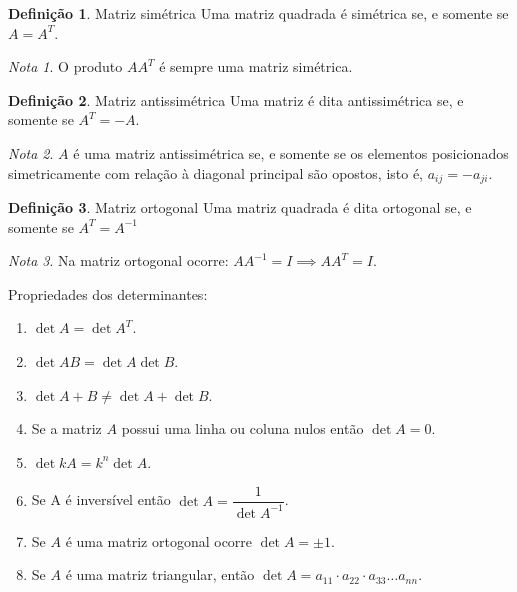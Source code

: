 \documentclass{article}
\theoremstyle{definition}
\newtheorem{definition}{Definição}
\theoremstyle{remark}
\newtheorem*{remark}{Nota}
\begin{document}
    \begin{definition}{Matriz simétrica}
        Uma matriz quadrada é simétrica se, e somente se $A = A^T$.
    \end{definition}
    \theoremstyle{remark}
    \begin{remark}
        O produto $AA^T$ é sempre uma matriz simétrica.
    \end{remark}
    \begin{definition}{Matriz antissimétrica}
        Uma matriz é dita antissimétrica se, e somente se $A^T = -A$.
    \end{definition}
    \begin{remark}
        $A$ é uma matriz antissimétrica se, e somente se os elementos posicionados simetricamente com relação à diagonal principal
        são opostos, isto é, $a_{ij} = -a_{ji}$.
    \end{remark}
    \begin{definition}{Matriz ortogonal}
        Uma matriz quadrada é dita ortogonal se, e somente se $A^T = A^{-1}$
    \end{definition}
    \begin{remark}
        Na matriz ortogonal ocorre: $AA^{-1} = I \implies AA^T = I$.
    \end{remark}
    Propriedades dos determinantes:
    \begin{enumerate}
        \item $\det A = \det{A^T}$.
        \item $\det{AB} = \det A \det B$.
        \item $\det{A+B} \neq \det A + \det B$.
        \item Se a matriz $A$ possui uma linha ou coluna nulos então $\det A = 0$.
        \item $\det{kA} = k^n \det A$.
        \item Se A é inversível então $\det A = \dfrac{1}{\det {A^{-1}} }$.
        \item Se $A$ é uma matriz ortogonal ocorre $\det A = \pm 1$.
        \item Se $A$ é uma matriz triangular, então $\det A = a_{11} \cdot a_{22} \cdot a_{33} \hdots a_{nn}$.
    \end{enumerate}
\end{document}

